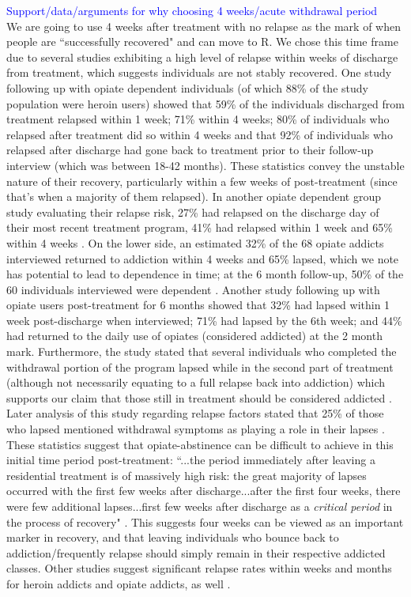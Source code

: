 \documentclass[12pt]{article}
\begin{document}
\textcolor{blue}{Support/data/arguments for why choosing 4 weeks/acute withdrawal period} \\
We are going to use 4 weeks after treatment with no relapse as the mark of when people are ``successfully recovered" and can move to R. We chose this time frame due to several studies exhibiting a high level of relapse within weeks of discharge from treatment, which suggests individuals are not stably recovered. One study following up with opiate dependent individuals (of which 88\% of the study population were heroin users) showed that 59\% of the individuals discharged from treatment relapsed within 1 week; 71\% within 4 weeks; 80\% of individuals who relapsed after treatment did so within 4 weeks and that 92\% of individuals who relapsed after discharge had gone back to treatment prior to their follow-up interview (which was between 18-42 months). These statistics convey the unstable nature of their recovery, particularly within a few weeks of post-treatment (since that's when a majority of them relapsed). In another opiate dependent group study evaluating their relapse risk, 27\% had relapsed on the discharge day of their most recent treatment program, 41\% had relapsed within 1 week and 65\% within 4 weeks \cite{Bailey}. On the lower side, an estimated 32\% of the 68 opiate addicts interviewed returned to addiction within 4 weeks and 65\% lapsed, which we note has potential to lead to dependence in time; at the 6 month follow-up, 50\% of the 60 individuals interviewed were dependent \cite{Broers}. Another study following up with opiate users post-treatment for 6 months showed that 32\% had lapsed within 1 week post-discharge when interviewed; 71\% had lapsed by the 6th week; and 44\% had returned to the daily use of opiates (considered addicted) at the 2 month mark. Furthermore, the study stated that several individuals who completed the withdrawal portion of the program lapsed while in the second part of treatment (although not necessarily equating to a full relapse back into addiction) which supports our claim that those still in treatment should be considered addicted \cite{Gossop1}. Later analysis of this study regarding relapse factors stated that 25\% of those who lapsed mentioned withdrawal symptoms as playing a role in their lapses \cite{Gossop2}. These statistics suggest that opiate-abstinence can be difficult to achieve in this initial time period post-treatment: ``...the period immediately after leaving a residential treatment is of massively high risk: the great majority of lapses occurred with the first few weeks after discharge...after the first four weeks, there were few additional lapses...first few weeks after discharge as a \textit{critical period} in the process of recovery" \cite{Gossop1}. This suggests four weeks can be viewed as an important marker in recovery, and that leaving individuals who bounce back to addiction/frequently relapse should simply remain in their respective addicted classes. Other studies suggest significant relapse rates within weeks and months for heroin addicts and opiate addicts, as well \cite{Hunt}. \\
\end{document}
